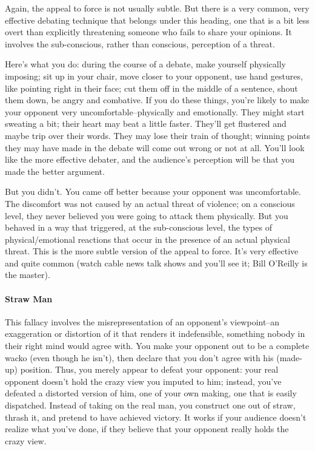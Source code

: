 Again, the appeal to force is not usually subtle. But there is a very common, very effective debating
technique that belongs under this heading, one that is a bit less overt than explicitly threatening
someone who fails to share your opinions. It involves the sub-conscious, rather than conscious,
perception of a threat.

Here's what you do: during the course of a debate, make yourself physically imposing; sit up in
your chair, move closer to your opponent, use hand gestures, like pointing right in their face; cut
them off in the middle of a sentence, shout them down, be angry and combative. If you do these
things, you're likely to make your opponent very uncomfortable--physically and emotionally.
They might start sweating a bit; their heart may beat a little faster. They'll get flustered and maybe
trip over their words. They may lose their train of thought; winning points they may have made in
the debate will come out wrong or not at all. You'll look like the more effective debater, and the
audience's perception will be that you made the better argument.

But you didn't. You came off better because your opponent was uncomfortable. The discomfort
was not caused by an actual threat of violence; on a conscious level, they never believed you were
going to attack them physically. But you behaved in a way that triggered, at the sub-conscious
level, the types of physical/emotional reactions that occur in the presence of an actual physical
threat. This is the more subtle version of the appeal to force. It's very effective and quite common
(watch cable news talk shows and you'll see it; Bill O'Reilly is the master).

\paragraph{Straw Man}

This fallacy involves the misrepresentation of an opponent's viewpoint--an exaggeration or
distortion of it that renders it indefensible, something nobody in their right mind would agree with.
You make your opponent out to be a complete wacko (even though he isn't), then declare that you
don't agree with his (made-up) position. Thus, you merely appear to defeat your opponent: your
real opponent doesn't hold the crazy view you imputed to him; instead, you've defeated a distorted
version of him, one of your own making, one that is easily dispatched. Instead of taking on the real
man, you construct one out of straw, thrash it, and pretend to have achieved victory. It works if
your audience doesn't realize what you've done, if they believe that your opponent really holds
the crazy view.

